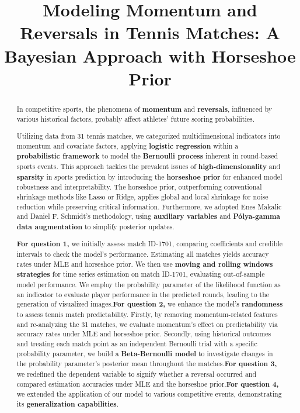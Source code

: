 \documentclass{mcmthesis}
\title{Modeling Momentum and Reversals in Tennis Matches: A Bayesian Approach with Horseshoe Prior}
\begin{document}
\begin{abstract}%

In competitive sports, the phenomena of \textbf{momentum} and \textbf{reversals}, influenced by various historical factors, probably affect athletes' future scoring probabilities. 

Utilizing data from 31 tennis matches, we categorized multidimensional indicators into momentum and covariate factors, applying \textbf{logistic regression} within a \textbf{probabilistic framework} to model the \textbf{Bernoulli process} inherent in round-based sports events. This approach tackles the prevalent issues of \textbf{high-dimensionality} and \textbf{sparsity} in sports prediction by introducing the \textbf{horseshoe prior} for enhanced model robustness and interpretability. The horseshoe prior, outperforming conventional shrinkage methods like Lasso or Ridge, applies global and local shrinkage for noise reduction while preserving critical information. Furthermore, we adopted Enes Makalic and Daniel F. Schmidt's methodology, using \textbf{auxiliary variables} and \textbf{Pólya-gamma data augmentation} to simplify posterior updates.

\textbf{For question 1,} we initially assess match ID-1701, comparing coefficients and credible intervals to check the model's performance. Estimating all matches yields accuracy rates under MLE and horseshoe prior. We then use \textbf{moving and rolling windows strategies} for time series estimation on match ID-1701, evaluating out-of-sample model performance. We employ the probability parameter of the likelihood function as an indicator to evaluate player performance in the predicted rounds, leading to the generation of visualized images.\textbf{For question 2,} we enhance the model's \textbf{randomness} to assess tennis match predictability. Firstly, by removing momentum-related features and re-analyzing the 31 matches, we evaluate momentum's effect on predictability via accuracy rates under MLE and horseshoe prior. Secondly, using historical outcomes and treating each match point as an independent Bernoulli trial with a specific probability parameter, we build a \textbf{Beta-Bernoulli model} to investigate changes in the probability parameter's posterior mean throughout the matches.\textbf{For question 3,} we redefined the dependent variable to signify whether a reversal occurred and compared estimation accuracies under MLE and the horseshoe prior.\textbf{For question 4,} we extended the application of our model to various competitive events, demonstrating its \textbf{generalization capabilities}. 


\end{abstract}
\end{document}

